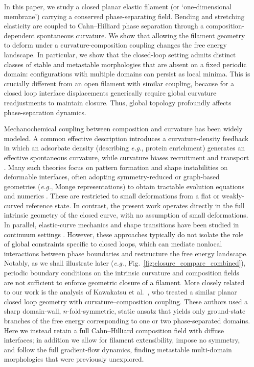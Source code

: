 \documentclass[
aip,
jcp,
reprint, 
floatfix
]{revtex4-1}
\begin{document}
In this paper, we study a closed planar elastic filament (or `one-dimensional membrane'\cite{mark2010physical}) carrying a conserved phase-separating field. Bending and stretching elasticity \cite{helfrich1973elastic,willmore1993riemannian} are coupled to Cahn--Hilliard phase separation \cite{10.1063/1.1744102} through a composition-dependent spontaneous curvature. We show that allowing the filament geometry to deform under a curvature-composition coupling changes the free energy landscape. In particular, we show that the closed-loop setting admits distinct classes of stable and metastable morphologies that are absent on a fixed periodic domain: configurations with multiple domains can persist as local minima. This is crucially different from an open filament with similar coupling, because for a closed loop interface displacements generically require global curvature readjustments to maintain closure. Thus, global topology profoundly affects phase-separation dynamics.

Mechanochemical coupling between composition and curvature has been widely modeled. A common effective description introduces a curvature-density feedback in which an adsorbate density (describing {\em e.g.}, protein enrichment) generates an effective spontaneous curvature, while curvature biases recruitment and transport \cite{markin1981lateral, GoychukFrey2019,tozzi2019out,le2021dynamic, kralj1996shapes}. Many such theories focus on pattern formation and shape instabilities on deformable interfaces, often adopting symmetry-reduced or graph-based geometries ({\em e.g.}, Monge representations) to obtain tractable evolution equations and numerics  \cite{Frey2023mechanochemical,PhysRevE.111.044405,elliott2021domain}. These are restricted to small deformations from a flat or weakly-curved reference state. In contrast, the present work operates directly in the full intrinsic geometry of the closed curve, with no assumption of small deformations. In parallel, elastic-curve mechanics and shape transitions have been studied in continuum settings \cite{nakayama1993motion,taloni2023general,brazda2023bifurcation}. However, these approaches typically do not isolate the role of global constraints specific to closed loops,
which can mediate nonlocal interactions between phase boundaries and restructure the free energy landscape. Notably, as we shall illustrate later ({\em e.g.}, Fig.~\ref{fig:closure_compare_combined}), periodic boundary conditions on the intrinsic curvature and composition fields are not sufficient to enforce geometric closure of a filament. More closely related to our work is the analysis of Kawakatsu et al.~\cite{kawakatsu1993}, who treated a similar planar closed loop geometry with curvature--composition coupling. These authors used a sharp domain-wall, $n$-fold-symmetric, static ansatz that yields only ground-state branches of the free energy corresponding to one or two phase-separated domains. Here we instead retain a full Cahn--Hilliard composition field with diffuse interfaces; in addition we allow for filament extensibility, impose no symmetry, and follow the full gradient-flow dynamics, finding metastable multi-domain morphologies that were previously unexplored.
\end{document}
